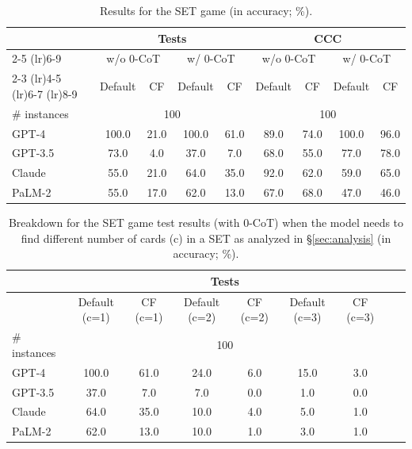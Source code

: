 \begin{table}[t!]
    \centering
    \begin{tabular}{lcccccccc}
        \toprule
        & \multicolumn{4}{c}{Tests} & \multicolumn{4}{c}{CCC} \\
        \cmidrule(lr){2-5}
         \cmidrule(lr){6-9}
        & \multicolumn{2}{c}{w/o 0-CoT} & \multicolumn{2}{c}{w/ 0-CoT} & \multicolumn{2}{c}{w/o 0-CoT} & \multicolumn{2}{c}{w/ 0-CoT}  \\
        \cmidrule(lr){2-3}
        \cmidrule(lr){4-5}
         \cmidrule(lr){6-7}
          \cmidrule(lr){8-9}
        & Default & CF & Default & CF & Default & CF & Default & CF\\
        \midrule
        \# instances & \multicolumn{4}{c}{100} & \multicolumn{4}{c}{100}  \\
        \midrule
        GPT-4 & 100.0 &	21.0&100.0 &	61.0 & 89.0	& 74.0& 100.0 & 	96.0 \\
        GPT-3.5 & \phantom{0}73.0 &	4.0	& \phantom{0}37.0	& \phantom{0}7.0 & 68.0 &	55.0& \phantom{0}77.0 &	78.0\\
        Claude & \phantom{0}55.0	& 21.0	&\phantom{0}64.0 & 35.0 &92.0 & 62.0& \phantom{0}59.0	& 65.0 \\
        PaLM-2 & \phantom{0}55.0 &	17.0&\phantom{0}62.0	 & 13.0 &67.0 &	68.0& \phantom{0}47.0	& 46.0 \\
        \bottomrule
    \end{tabular}
    \caption{Results for the SET game (in accuracy; \%).}
\end{table}

\begin{table}[t!]
    \centering
    \begin{tabular}{lcccccccc}
        \toprule
        & \multicolumn{6}{c}{Tests} \\
        \midrule
        & Default (c=1) & CF (c=1) & Default (c=2)& CF (c=2) & Default (c=3) & CF (c=3) \\
        \midrule
        \# instances & \multicolumn{6}{c}{100}  \\
        \midrule
        GPT-4 & 100.0	&61.0	&24.0	&6.0	&15.0	&3.0 \\
        GPT-3.5 & \phantom{0}37.0	&\phantom{0}7.0	&\phantom{0}7.0	&0.0	&\phantom{0}1.0	&0.0 \\
        Claude & \phantom{0}64.0	&35.0	&10.0	&4.0	&\phantom{0}5.0	&1.0 \\
        PaLM-2 & \phantom{0}62.0	&13.0	&10.0	&1.0	&\phantom{0}3.0	&1.0 \\
        \bottomrule
    \end{tabular}
    \caption{Breakdown for the SET game test results (with 0-CoT) when the model needs to find different number of cards (c) in a SET as analyzed in \S\ref{sec:analysis} (in accuracy; \%).}
    \label{tab:numbers-set-hints}
\end{table}

